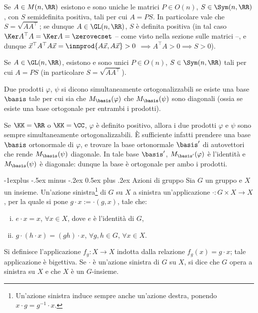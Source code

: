 \documentclass[10pt,landscape]{article}
\makeatletter
\renewcommand{\subsection}{\@startsection{subsection}{2}{0mm}%
	{-1explus -.5ex minus -.2ex}%
	{0.5ex plus .2ex}%
	{\normalfont\normalsize\bfseries}}
\makeatother
\begin{document}
\begin{multicols}{3}
		Se $A \in M(n, \RR)$ esistono e sono uniche le
		matrici $P \in O(n)$, $S \in \Sym(n, \RR)$, con $S$ semidefinita positiva, tali per
		cui $A = PS$. In particolare vale che $S = \sqrt{A A^\top}$; se dunque $A \in \GL(n, \RR)$, $S$ è
		definita positiva (in tal caso $\Ker A^\top A = \Ker A = \zerovecset$ -- come visto nella sezione sulle matrici --, e dunque $\vec x^\top A^\top A \vec x = \innprod{A \vec x, A \vec x} > 0$ $\implies A^\top A > 0 \implies S > 0$).
		
		Se $A \in \GL(n, \RR)$, esistono e sono unici $P \in O(n)$,
		$S \in \Sym(n, \RR)$ tali per cui $A = PS$ (in particolare $S = \sqrt{A A^\top}$).
		
		Due prodotti $\varphi$, $\psi$ si dicono simultaneamente ortogonalizzabili se esiste una
		base $\basis$ tale per cui sia che $M_\basis(\varphi)$ che $M_\basis(\psi)$ sono
		diagonali (ossia se esiste una base ortogonale per
		entrambi i prodotti). \\ \vskip 0.05in

		Se $\KK=\RR$ o $\KK=\CC$, $\varphi$ è definito positivo, allora
		i due prodotti $\varphi$ e $\psi$ sono sempre simultaneamente ortogonalizzabili. È sufficiente infatti prendere
		una base $\basis$ ortonormale di $\varphi$, e trovare la base ortonormale $\basis'$ di autovettori
		che rende $M_\basis(\psi)$ diagonale. In tale base $\basis'$, $M_{\basis'}(\varphi)$
		è l'identità e $M_\basis(\psi)$ è diagonale: dunque la base è ortogonale per ambo
		i prodotti.
		
		\subsection{Azioni di gruppo}
		Sia $G$ un gruppo e $X$ un insieme. Un'azione sinistra\footnote{Un'azione sinistra induce sempre anche un'azione destra, ponendo $x \cdot g=g^{-1} \cdot x$.} di $G$ su $X$ a sinistra un'applicazione $\cdot : G \times X \rightarrow X$, per la quale si pone $g \cdot x := \cdot(g, x)$, tale che:

		\begin{enumerate}[(i)]
			\item $e \cdot x=x$, $\forall x \in X$, dove $e$ è l'identità di $G$,
			\item $g \cdot (h \cdot x)=(gh) \cdot x$, $\forall g, h \in G$, $\forall x \in X$.
		\end{enumerate}

		Si definisce l'applicazione $f_g:X\rightarrow X$ indotta dalla relazione $f_g(x)=g \cdot x$; tale applicazione è bigettiva. Se $\cdot$ è un'azione sinistra di $G$ su $X$, si dice che $G$ opera a sinistra su $X$ e che $X$ è un $G$-insieme. \\
		

\end{multicols}
\end{document}
